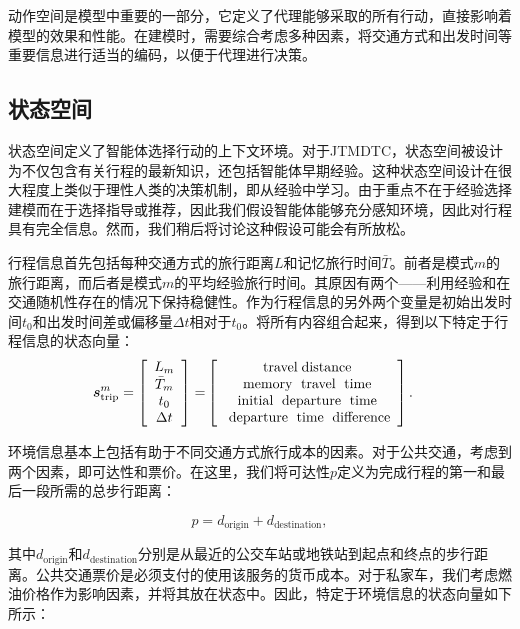 动作空间是模型中重要的一部分，它定义了代理能够采取的所有行动，直接影响着模型的效果和性能。在建模时，需要综合考虑多种因素，将交通方式和出发时间等重要信息进行适当的编码，以便于代理进行决策。
\subsection{状态空间}

状态空间定义了智能体选择行动的上下文环境。对于JTMDTC，状态空间被设计为不仅包含有关行程的最新知识，还包括智能体早期经验。这种状态空间设计在很大程度上类似于理性人类的决策机制，即从经验中学习。由于重点不在于经验选择建模而在于选择指导或推荐，因此我们假设智能体能够充分感知环境，因此对行程具有完全信息。然而，我们稍后将讨论这种假设可能会有所放松。

行程信息首先包括每种交通方式的旅行距离$L$和记忆旅行时间$\bar{T}$。前者是模式$m$的旅行距离，而后者是模式$m$的平均经验旅行时间。其原因有两个——利用经验和在交通随机性存在的情况下保持稳健性。作为行程信息的另外两个变量是初始出发时间$t_0$和出发时间差或偏移量$\Delta t$相对于$t_0$。将所有内容组合起来，得到以下特定于行程信息的状态向量：
\begin{equation}
\begin{aligned}
{\bm{s}_\text{trip}^m}=\left[\begin{array}{c}
L_m \\
{\bar{T}}_m \\
t_{0} \\
\Delta t
\end{array}\right]=&\left[\begin{array}{c}
\text { travel\;distance } \\
\text { memory\; travel\; time } \\
\text { initial\; departure\; time } \\
\text { departure\; time\; difference}
\end{array}\right].
\end{aligned}\label{equation:trip}
\end{equation}

环境信息基本上包括有助于不同交通方式旅行成本的因素。对于公共交通，考虑到两个因素，即可达性和票价。在这里，我们将可达性$p$定义为完成行程的第一和最后一段所需的总步行距离：

\begin{equation}
p=d_{\text{origin}}+d_{\text{destination}},
\end{equation}

其中$d_{\text{origin}}$和$d_{\text{destination}}$分别是从最近的公交车站或地铁站到起点和终点的步行距离。公共交通票价是必须支付的使用该服务的货币成本。对于私家车，我们考虑燃油价格作为影响因素，并将其放在状态中。因此，特定于环境信息的状态向量如下所示：


